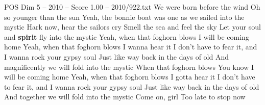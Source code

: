 \begin{textsample}{POS Dim 5 – 2010 – Score 1.00 – 2010/922.txt}  \label{ex:f5_pos_034}
We were born before the wind Oh so younger than the sun Yeah, the bonnie boat was one as we sailed into the mystic Hark now, hear the sailors cry Smell the sea and feel the sky Let your soul and \textbf{spirit} fly into the mystic Yeah, when that foghorn blows I will be coming home Yeah, when that foghorn blows I wanna hear it I don't have to fear it, and I wanna rock your gypsy soul Just like way back in the days of old And magnificently we will fold into the mystic When that foghorn blows You know I will be coming home Yeah, when that foghorn blows I gotta hear it I don't have to fear it, and I wanna rock your gypsy soul Just like way back in the days of old And together we will fold into the mystic Come on, girl Too late to stop now

\end{textsample}
